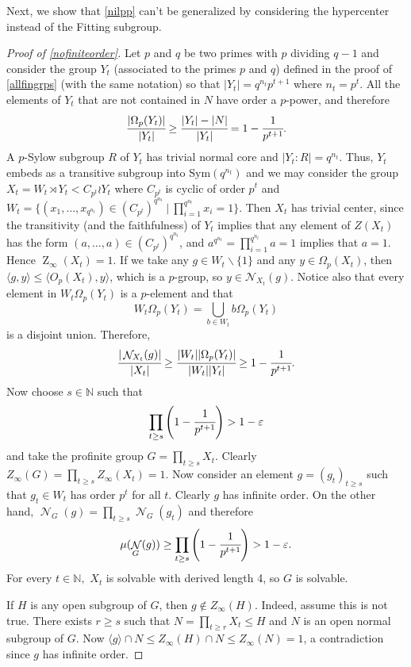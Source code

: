 \documentclass{amsart}
\DeclareMathOperator{\nil}{\mathcal N}
\DeclareMathOperator{\Z}{Z}
\newcommand{\sym}{\mathrm{Sym}}
\newcommand{\la}{\langle}
\newcommand{\ra}{\rangle}
\numberwithin{equation}{section}
\begin{document}
Next, we show that \cref{nilpp} can't be generalized by considering the hypercenter instead of the Fitting subgroup.

\begin{proof}[Proof of \cref{nofiniteorder}]
Let $p$ and $q$ be two primes with $p$ dividing $q-1$ and consider the group $Y_t$ (associated to the primes $p$ and $q$) defined in the proof of \cref{allfingrps} (with the same notation) so that $|Y_t|=q^{n_t} p^{t+1}$ where $n_t=p^t$.  All the elements of $Y_t$ that are not contained in $N$ have order a $p$-power, and therefore $$\cfrac{|\Omega_p(Y_t)|}{|Y_t|} \geq \cfrac{|Y_t|-|N|}{|Y_t|} = 1-\cfrac{1}{p^{t+1}}.$$
 A $p$-Sylow subgroup $R$ of $Y_t$ has trivial normal core and $|Y_t:R|=q^{n_t}$. Thus, $Y_t$ embeds as a transitive subgroup into $\sym(q^{n_t})$ and we may consider the group $X_t = W_t \rtimes Y_t < C_{p^t} \wr Y_t$ where $C_{p^t}$ is cyclic of order $p^t$ and $W_t = \{(x_1,\ldots,x_{q^{n_t}}) \in (C_{p^t})^{q^{n_t}}\ |\ \prod_{i=1}^{q^{n_t}}x_i=1\}$. Then $X_t$ has trivial center, since the transitivity (and the faithfulness) of $Y_t$ implies that any element of $Z(X_t)$ has the form $(a,\ldots,a) \in (C_{p^t})^{q^{n_t}}$, and $a^{q^{n_t}} = \prod_{i=1}^{q^{n_t}}a = 1$ implies that $a=1$. Hence $\Z_\infty(X_t)=1.$ If we take any $g \in W_t \smallsetminus \{1\}$ and any $y \in \Omega_p(X_t)$, then $\la g,y\ra \leq \la O_p(X_t),y\ra$, which is a $p$-group, so $y \in \mathcal N_{X_t}(g)$. Notice also that every element in $W_t \Omega_p(Y_t)$ is a $p$-element and that
\[W_t \Omega_p(Y_t) = \bigcup_{b \in W_t} b\Omega_p(Y_t)\]
is a disjoint union. Therefore,
\[\cfrac{|\nil_{X_t}(g)|}{|X_t|} \geq \cfrac{|W_t||\Omega_p(Y_t)|}{|W_t||Y_t|}  \geq 1-\cfrac{1}{p^{t+1}}.\]
Now choose $s\in \mathbb N$ such that
$$\prod_{t \geq s}\left( 1- \cfrac{1}{p^{t+1}} \right) > 1-\varepsilon$$ and take the profinite group $G=\prod_{t\geq s} X_t.$ 
Clearly $Z_\infty(G)=\prod_{t\geq s} Z_\infty(X_t)=1$.
Now consider an element $g = (g_t)_{t \geq s}$ such that $g_t \in W_t$ has order $p^t$ for all $t$. Clearly $g$ has infinite order. On the other hand, $\nil_G(g)=\prod_{t\geq s}  \nil_G(g_t)$ and therefore
$$\mu(\nil_G(g)) \geq \prod_{t \geq s}\left( 1- \cfrac{1}{p^{t+1}} \right) > 1-\varepsilon.$$
For every $t\in \mathbb N,$ $X_t$ is solvable with derived length 4, so $G$ is solvable.

If $H$ is any open subgroup of $G$, then $g \not \in Z_{\infty}(H)$. Indeed, assume this is not true. There exists $r \geq s$ such that $N = \prod_{t \geq r} X_t \leq H$ and $N$ is an open normal subgroup of $G$. Now $\langle g \rangle \cap N \leq Z_{\infty}(H) \cap N \leq Z_{\infty}(N) = 1$, a contradiction since $g$ has infinite order.
\end{proof}
\end{document}
